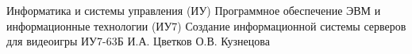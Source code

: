 \makecourseworktitle
{Информатика и системы управления (ИУ)}
{Программное обеспечение ЭВМ и информационные технологии (ИУ7)}
{Создание информационной системы серверов для видеоигры}
{ИУ7-63Б}
{И.А. Цветков}
{О.В. Кузнецова}{}{}
